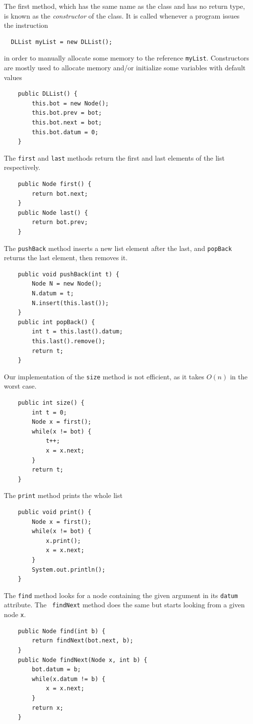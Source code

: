 \documentclass[a4paper]{book}
\theoremstyle{changebreak}                %
\begin{document}
The first method, which has the same name as the class and has no
return type, is known as the {\it
  constructor} of the
class. It is called whenever a program issues
the instruction
\begin{verbatim}
  DLList myList = new DLList();
\end{verbatim}
in order to manually allocate some memory to the
reference {\tt myList}. Constructors are mostly used
to allocate memory and/or initialize some
variables with default values
{\small
\begin{verbatim}
    public DLList() {
        this.bot = new Node();
        this.bot.prev = bot;
        this.bot.next = bot;
        this.bot.datum = 0;
    }
\end{verbatim}
} The {\tt first} and {\tt last}
methods return the first and last elements of the list respectively.
{\small
\begin{verbatim}
    public Node first() {
        return bot.next;
    }
    public Node last() {
        return bot.prev;
    }
\end{verbatim}
} The {\tt pushBack} method inserts a new list
element after the last, and {\tt popBack} returns the
last element, then removes it.  {\small
\begin{verbatim}
    public void pushBack(int t) {
        Node N = new Node();
        N.datum = t;
        N.insert(this.last());
    }
    public int popBack() {
        int t = this.last().datum;
        this.last().remove();
        return t;
    }
\end{verbatim}
} Our implementation of the {\tt size} method is not
efficient, as it takes $O(n)$ in the worst case.  {\small
\begin{verbatim}
    public int size() {
        int t = 0;
        Node x = first();
        while(x != bot) {
            t++;
            x = x.next;
        }
        return t;
    }
\end{verbatim}
} The {\tt print} method prints the whole list
{\small
\begin{verbatim}
    public void print() {
        Node x = first();
        while(x != bot) {
            x.print();
            x = x.next;
        }
        System.out.println();
    }
\end{verbatim}
}The {\tt find} method looks for a node containing
the given argument in its {\tt datum} attribute. The {\tt
  findNext} method does the same but starts
looking from a given node {\tt x}.  {\small
\begin{verbatim}
    public Node find(int b) {
        return findNext(bot.next, b);
    }
    public Node findNext(Node x, int b) {
        bot.datum = b;
        while(x.datum != b) {
            x = x.next;
        }
        return x;
    }
\end{verbatim}
}
\end{document}

